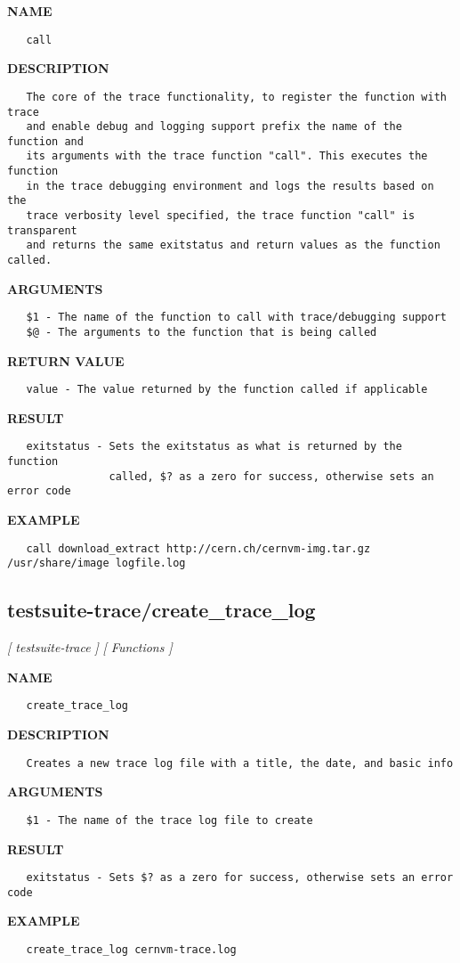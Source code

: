 \label{ch:robo42}
\label{ch:testsuite_trace_call}
\textbf{NAME}
\begin{verbatim}
   call
\end{verbatim}
\textbf{DESCRIPTION}
\begin{verbatim}
   The core of the trace functionality, to register the function with trace
   and enable debug and logging support prefix the name of the function and
   its arguments with the trace function "call". This executes the function
   in the trace debugging environment and logs the results based on the 
   trace verbosity level specified, the trace function "call" is transparent
   and returns the same exitstatus and return values as the function called.
\end{verbatim}
\textbf{ARGUMENTS}
\begin{verbatim}
   $1 - The name of the function to call with trace/debugging support
   $@ - The arguments to the function that is being called
\end{verbatim}
\textbf{RETURN VALUE}
\begin{verbatim}
   value - The value returned by the function called if applicable
\end{verbatim}
\textbf{RESULT}
\begin{verbatim}
   exitstatus - Sets the exitstatus as what is returned by the function
                called, $? as a zero for success, otherwise sets an error code
\end{verbatim}
\textbf{EXAMPLE}
\begin{verbatim}
   call download_extract http://cern.ch/cernvm-img.tar.gz /usr/share/image logfile.log
\end{verbatim}
\newpage
\subsection{testsuite-trace/create\_trace\_log}
\textsl{[ testsuite-trace ]}
\textsl{[ Functions ]}

\label{ch:robo43}
\label{ch:testsuite_trace_create_trace_log}
\textbf{NAME}
\begin{verbatim}
   create_trace_log
\end{verbatim}
\textbf{DESCRIPTION}
\begin{verbatim}
   Creates a new trace log file with a title, the date, and basic info
\end{verbatim}
\textbf{ARGUMENTS}
\begin{verbatim}
   $1 - The name of the trace log file to create
\end{verbatim}
\textbf{RESULT}
\begin{verbatim}
   exitstatus - Sets $? as a zero for success, otherwise sets an error code
\end{verbatim}
\textbf{EXAMPLE}
\begin{verbatim}
   create_trace_log cernvm-trace.log
\end{verbatim}
\newpage
